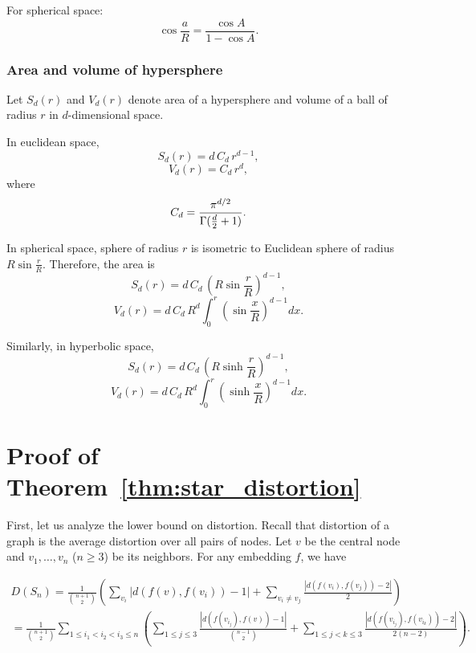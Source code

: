 \documentclass[runningheads]{llncs}
\begin{document}
For spherical space:
\begin{equation}\label{eq:sph_eq}
\cos{\frac{a}{R}} = \frac{\cos A}{1 - \cos A}.
\end{equation}

\subsubsection{Area and volume of hypersphere}

Let $S_d(r)$ and $V_d(r)$ denote area of a hypersphere and volume of a ball of radius $r$ in $d$-dimensional space. 

In euclidean space,
\[
S_d(r)= d \, C_{d} \, r^{d-1},
\]
\[
V_d(r)= C_{d} \, r^{d},
\]
where
\[
C_{d}={\frac  {\pi ^{{d/2}}}{\Gamma ({d \over 2}+1)}}.
\]

In spherical space, sphere of radius $r$ is isometric to Euclidean sphere of radius $R \sin \frac{r}{R}$. Therefore, the area is 
\[
S_d(r)= d \, C_{d} \, \left( R \sin \frac{r}{R} \right)^{d-1},
\]
\[
V_d(r)= d \, C_{d} \, R^d \int_{0}^{r} \left( \sin \frac{x}{R} \right)^{d-1} d x .
\]

Similarly, in hyperbolic space,
\[
S_d(r)= d \, C_{d} \, \left( R \sinh \frac{r}{R} \right)^{d-1},
\]
\[
V_d(r)= d \, C_{d} \, R^d \int_{0}^{r} \left( \sinh \frac{x}{R} \right)^{d-1} d x .
\]

\section{Proof of Theorem~\ref{thm:star_distortion}}\label{sec:proof:star_distortion}

First, let us analyze the lower bound on distortion. Recall that distortion of a graph is the average distortion over all pairs of nodes. Let $v$ be the central node and $v_1, \ldots, v_n$ ($n \ge 3$) be its neighbors. For any embedding $f$, we have
\begin{small}
\begin{multline*}
D(S_n) = \frac{1}{\binom{n+1}{2}} \left( \sum_{v_i} {|d(f(v),f(v_i)) - 1|} + \sum_{v_i \neq v_j} \frac{|d(f(v_i),f(v_j)) - 2|}{2} \right) \\
= \frac{1}{\binom{n+1}{2}} \sum_{1 \le i_1 < i_2 < i_3 \le n} \left(
\sum_{1\le j \le 3}  \frac{|d(f(v_{i_j}),f(v)) - 1|}{{n-1 \choose 2}} +
\sum_{1\le j < k\le 3}  \frac{|d(f(v_{i_j}),f(v_{i_k})) - 2|}{2(n-2)}   \right).
\end{multline*}
\end{small}
\end{document}

